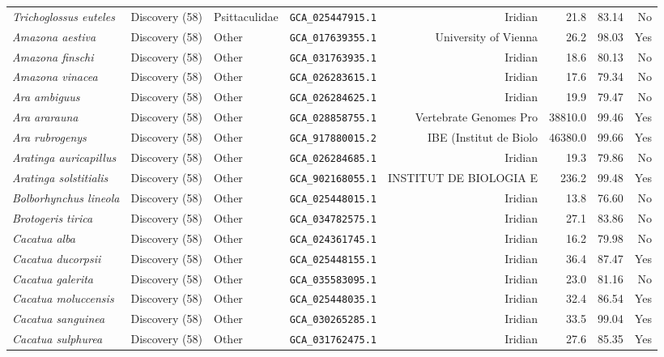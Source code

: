 \documentclass[9pt,a4paper]{article}
\begin{document}
\begin{longtable}{llllrrrr}
\textit{Trichoglossus euteles} & Discovery (58) & Psittaculidae & \texttt{GCA\_025447915.1} & Iridian & 21.8 & 83.14 & No \\
\textit{Amazona aestiva} & Discovery (58) & Other & \texttt{GCA\_017639355.1} & University of Vienna & 26.2 & 98.03 & Yes \\
\textit{Amazona finschi} & Discovery (58) & Other & \texttt{GCA\_031763935.1} & Iridian & 18.6 & 80.13 & No \\
\textit{Amazona vinacea} & Discovery (58) & Other & \texttt{GCA\_026283615.1} & Iridian & 17.6 & 79.34 & No \\
\textit{Ara ambiguus} & Discovery (58) & Other & \texttt{GCA\_026284625.1} & Iridian & 19.9 & 79.47 & No \\
\textit{Ara ararauna} & Discovery (58) & Other & \texttt{GCA\_028858755.1} & Vertebrate Genomes Pro & 38810.0 & 99.46 & Yes \\
\textit{Ara rubrogenys} & Discovery (58) & Other & \texttt{GCA\_917880015.2} & IBE (Institut de Biolo & 46380.0 & 99.66 & Yes \\
\textit{Aratinga auricapillus} & Discovery (58) & Other & \texttt{GCA\_026284685.1} & Iridian & 19.3 & 79.86 & No \\
\textit{Aratinga solstitialis} & Discovery (58) & Other & \texttt{GCA\_902168055.1} & INSTITUT DE BIOLOGIA E & 236.2 & 99.48 & Yes \\
\textit{Bolborhynchus lineola} & Discovery (58) & Other & \texttt{GCA\_025448015.1} & Iridian & 13.8 & 76.60 & No \\
\textit{Brotogeris tirica} & Discovery (58) & Other & \texttt{GCA\_034782575.1} & Iridian & 27.1 & 83.86 & No \\
\textit{Cacatua alba} & Discovery (58) & Other & \texttt{GCA\_024361745.1} & Iridian & 16.2 & 79.98 & No \\
\textit{Cacatua ducorpsii} & Discovery (58) & Other & \texttt{GCA\_025448155.1} & Iridian & 36.4 & 87.47 & Yes \\
\textit{Cacatua galerita} & Discovery (58) & Other & \texttt{GCA\_035583095.1} & Iridian & 23.0 & 81.16 & No \\
\textit{Cacatua moluccensis} & Discovery (58) & Other & \texttt{GCA\_025448035.1} & Iridian & 32.4 & 86.54 & Yes \\
\textit{Cacatua sanguinea} & Discovery (58) & Other & \texttt{GCA\_030265285.1} & Iridian & 33.5 & 99.04 & Yes \\
\textit{Cacatua sulphurea} & Discovery (58) & Other & \texttt{GCA\_031762475.1} & Iridian & 27.6 & 85.35 & Yes \\

\end{longtable}
\end{document}
